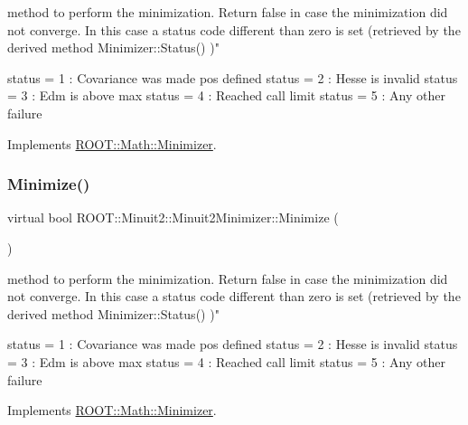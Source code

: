 method to perform the minimization. Return false in case the minimization did not converge. In this case a status code different than zero is set (retrieved by the derived method Minimizer\+::\+Status() )"

status = 1 \+: Covariance was made pos defined status = 2 \+: Hesse is invalid status = 3 \+: Edm is above max status = 4 \+: Reached call limit status = 5 \+: Any other failure 

Implements \mbox{\hyperlink{classROOT_1_1Math_1_1Minimizer_a5f6a6307935a17fb13dac1ee7f1c41fd}{R\+O\+O\+T\+::\+Math\+::\+Minimizer}}.

\mbox{\label{classROOT_1_1Minuit2_1_1Minuit2Minimizer_af5d2da195d2b1a7eac6d9b8859eec2b9}} 
\subsubsection{\texorpdfstring{Minimize()}{Minimize()}\hspace{0.1cm}{\footnotesize\ttfamily [2/2]}}
{\footnotesize\ttfamily virtual bool R\+O\+O\+T\+::\+Minuit2\+::\+Minuit2\+Minimizer\+::\+Minimize (\begin{DoxyParamCaption}{ }\end{DoxyParamCaption})\hspace{0.3cm}{\ttfamily [virtual]}}

method to perform the minimization. Return false in case the minimization did not converge. In this case a status code different than zero is set (retrieved by the derived method Minimizer\+::\+Status() )"

status = 1 \+: Covariance was made pos defined status = 2 \+: Hesse is invalid status = 3 \+: Edm is above max status = 4 \+: Reached call limit status = 5 \+: Any other failure 

Implements \mbox{\hyperlink{classROOT_1_1Math_1_1Minimizer_a5f6a6307935a17fb13dac1ee7f1c41fd}{R\+O\+O\+T\+::\+Math\+::\+Minimizer}}.

\mbox{\label{classROOT_1_1Minuit2_1_1Minuit2Minimizer_a4a1c7fc174527aefab3d8c87bf8c0672}} 
